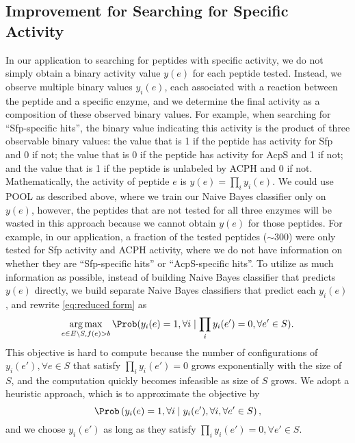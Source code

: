 \subsection{Improvement for Searching for Specific Activity} \label{sec:extension}
In our application to searching for peptides with specific activity, we do not simply obtain a binary activity value $y(e)$
for each peptide tested. Instead, we observe multiple binary values $y_i(e)$, each associated with a reaction between the 
peptide and a specific enzyme, and we determine the final activity as a composition of these observed binary values. 
For example, when searching for \enquote{Sfp-specific hits}, the binary value indicating this activity is the product of 
three observable binary values: the value that is 1 if the peptide has activity for Sfp and 0 if not; the value that is 0 
if the peptide has activity for AcpS and 1 if not; and the value that is 1 if the peptide is unlabeled by ACPH and 0 if not.
Mathematically, the activity of peptide $e$ is $y(e) = \prod_i y_i(e)$. We could use POOL as described above, where we train 
our Naive Bayes classifier only on $y(e)$, however, the peptides that are not tested for all three enzymes will be wasted in
this approach because we cannot obtain $y(e)$ for those peptides. For example, in our application, a fraction of the tested 
peptides ($\sim 300$) were only tested for Sfp activity and ACPH activity, where we do not have information on whether they 
are \enquote{Sfp-specific hits} or \enquote{AcpS-specific hits}. To utilize as much information as possible, instead of building 
Naive Bayes classifier that predicts $y(e)$ directly, we build separate Naive Bayes classifiers that predict each $y_i(e)$, and rewrite \eqref{eq:reduced form} as
\begin{equation}
  \underset{e \in E \backslash S, f(e) > b}{\mathrm{arg}\max} \, \Prob (y_i(e)=1, \forall i \mid \prod_i y_i(e') = 0, \forall e' \in S).
  \label{eq:extension}
\end{equation}
This objective is hard to compute because the number of configurations of $y_i(e'), \forall e \in S$ that satisfy $\prod_i y_i(e') = 0$ grows exponentially with the size of $S$, and the computation quickly becomes infeasible as size of $S$ grows. We adopt a heuristic approach, which is to approximate the objective by
\begin{equation}
  \Prob \left( y_i(e)=1, \forall i \mid y_i(e'), \forall i, \forall e' \in S \right),
  \label{}
\end{equation}
and we choose $y_i(e')$ as long as they satisfy $\prod_i y_i(e') = 0, \forall e' \in S$.